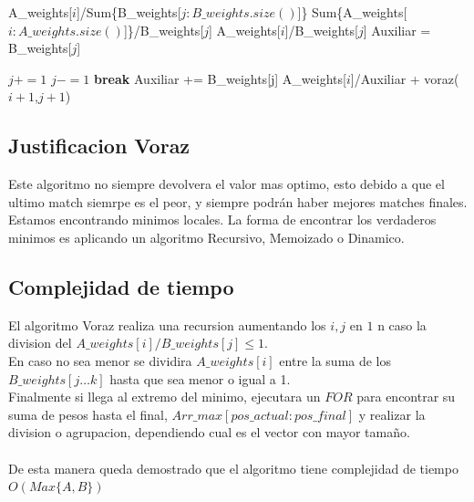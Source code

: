 \documentclass[12pt]{article}
\newcommand{\TITLE}[1]{\item[#1]}
\begin{document}
\par\null\par

\begin{algorithmic}[1]
		\TITLE{\textsc{voraz}$(i,j)$}
  \RETURN A\_weights[$i$]/Sum\{B\_weights[$j:B\_weights.size()$]\}
  \ENDIF
  \RETURN Sum\{A\_weights[$i:A\_weights.size()$]\}/B\_weights[$j$]
  \ENDIF
  \RETURN A\_weights[$i$]/B\_weights[$j$]
  \ENDIF
  \STATE Auxiliar = B\_weights[$j$]
  
  \STATE $j+=1$
  \STATE $j-=1$
  \STATE \textbf{break}
  \ENDIF
  \STATE Auxiliar += B\_weights[j]
  \ENDWHILE
  \RETURN A\_weights[$i$]/Auxiliar + voraz($i+1$,$j+1$)

 \end{algorithmic}
 \subsection{Justificacion Voraz}
 Este algoritmo no siempre devolvera el valor mas optimo, esto debido a que el ultimo match siemrpe es el peor, y siempre podrán haber mejores matches finales. Estamos encontrando minimos locales. La forma de encontrar los verdaderos minimos es aplicando un algoritmo Recursivo, Memoizado o Dinamico.

 \subsection{Complejidad de tiempo}

 El algoritmo Voraz realiza una recursion aumentando los $i,j$ en $1$ n caso la division del $A\_weights[i]/B\_weights[j] \leq 1$.\\
 En caso no sea menor se dividira $A\_weights[i]$ entre la suma de los $B\_weights[j \dots k]$ hasta que sea menor o igual a 1.\\
 Finalmente si llega al extremo del minimo, ejecutara un $FOR$ para encontrar su suma de pesos hasta el final, $Arr\_max[pos\_actual : pos\_final]$ y realizar la division o agrupacion, dependiendo cual es el vector con mayor tamaño.\\ \\
 De esta manera queda demostrado que el algoritmo tiene complejidad de tiempo $O(Max\{A,B\})$
\end{document}
